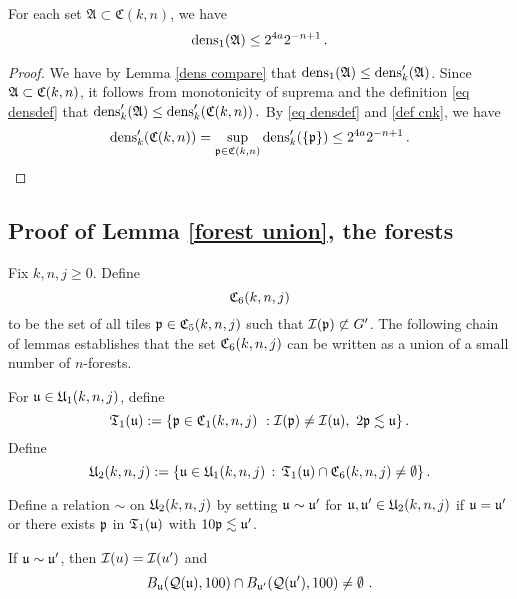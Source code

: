 {\begin{lemma}
    \label{C dens1}
    For each set $\mathfrak{A} \subset \mathfrak{C}(k,n)$, we have
    $$
        \dens_1(\mathfrak{A}) \le 2^{4a}2^{-n+1}\,.
    $$
\end{lemma}

\begin{proof}
    We have by Lemma \ref{dens compare} that
    $\dens_1(\mathfrak{A}) \le \dens_k'(\mathfrak{A})$. Since $\mathfrak{A} \subset \fC(k,n)$, it follows from monotonicity of suprema and the definition \eqref{eq densdef} that
    $
        \dens_k'(\mathfrak{A}) \le \dens_k'(\fC(k,n))\,.
    $
    By \eqref{eq densdef} and \eqref{def cnk}, we have
    $$
        \dens_k'(\fC(k,n)) = \sup_{\fp \in \fC(k,n)} \dens_k'(\{\fp\}) \le 2^{4a}2^{-n+1}\,.
    $$
\end{proof}

\subsection{Proof of Lemma \ref{forest union}, the forests}
\label{subsecforest}

Fix $k,n,j\ge 0$.
Define
$$
    \fC_6(k,n,j)
$$
to be the set of all tiles $\fp \in \fC_5(k,n,j)$ such that $\sc(\fp) \not\subset G'$. The following chain of lemmas
establishes that the set $\fC_6(k,n,j)$ can be written as a union of a small number of $n$-forests.

For $\fu\in \fU_1(k,n,j)$, define
\begin{equation}
    \label{eq T1 def}
    \mathfrak{T}_1(\fu):= \{\fp \in \fC_1(k,n,j) \ : \sc(\fp)\neq \sc(\fu), \ 2\fp \lesssim  \fu\}\,.
\end{equation}
Define
\begin{equation}
    \label{eq U2 def}
    \fU_2(k,n,j) := \{ \fu \in \fU_1(k,n,j) \, : \, \mathfrak{T}_1(\fu)  \cap \fC_6(k,n,j) \ne \emptyset\}\,.
\end{equation}

Define a relation $\sim$ on $\fU_2(k,n,j)$
by setting $\fu\sim \fu'$
for $\fu,\fu'\in \fU_2(k,n,j)$
if $\fu=\fu'$ or there exists $\fp$ in $\mathfrak{T}_1(\fu)$
with $10 \fp\lesssim \fu'$.

\begin{lemma}
    \label{relation geometry}
    If $\fu \sim \fu'$, then $\sc(u) = \sc(u')$ and
    \begin{equation*}
        B_{\fu}(\fcc(\fu), 100) \cap B_{\fu'}(\fcc(\fu'), 100) \neq \emptyset\ .
    \end{equation*}
\end{lemma}

}
